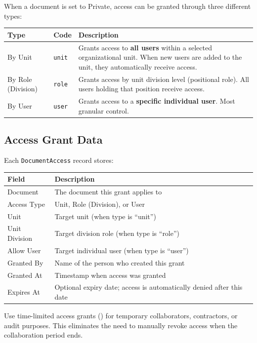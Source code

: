 When a document is set to Private, access can be granted
through three different types:

\begin{tabularx}{\textwidth}{@{} l l X @{}}
  \toprule
  \textbf{Type} & \textbf{Code}
    & \textbf{Description} \\
  \midrule
  By Unit
    & \texttt{unit}
    & Grants access to \textbf{all users} within a
      selected organizational unit. When new users
      are added to the unit, they automatically
      receive access. \\
  By Role (Division)
    & \texttt{role}
    & Grants access by unit division level
      (positional role). All users holding that
      position receive access. \\
  By User
    & \texttt{user}
    & Grants access to a \textbf{specific individual
      user}. Most granular control. \\
  \bottomrule
\end{tabularx}

\subsection{Access Grant Data}

Each \texttt{DocumentAccess} record stores:

\begin{tabularx}{\textwidth}{@{} l X @{}}
  \toprule
  \textbf{Field} & \textbf{Description} \\
  \midrule
  Document
    & The document this grant applies to \\
  Access Type
    & Unit, Role (Division), or User \\
  Unit
    & Target unit (when type is ``unit'') \\
  Unit Division
    & Target division role (when type is ``role'') \\
  Allow User
    & Target individual user (when type is ``user'') \\
  Granted By
    & Name of the person who created this grant \\
  Granted At
    & Timestamp when access was granted \\
  Expires At
    & Optional expiry date; access is automatically
      denied after this date \\
  \bottomrule
\end{tabularx}

\begin{ugTip}
  Use time-limited access grants () for
  temporary collaborators, contractors, or audit purposes.
  This eliminates the need to manually revoke access when
  the collaboration period ends.
\end{ugTip}


